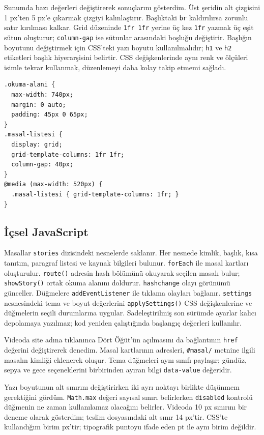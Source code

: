 \documentclass[12pt,a4paper]{article}
\begin{document}
Sunumda bazı değerleri değiştirerek sonuçlarını gösterdim. Üst şeridin alt çizgisini 1 px'ten 5 px'e çıkarmak çizgiyi kalınlaştırır. Başlıktaki \texttt{br} kaldırılırsa zorunlu satır kırılması kalkar. Grid düzeninde \texttt{1fr 1fr} yerine üç kez \texttt{1fr} yazmak üç eşit sütun oluşturur; \texttt{column-gap} ise sütunlar arasındaki boşluğu değiştirir. Başlığın boyutunu değiştirmek için CSS'teki yazı boyutu kullanılmalıdır; \texttt{h1} ve \texttt{h2} etiketleri başlık hiyerarşisini belirtir. CSS değişkenlerinde aynı renk ve ölçüleri isimle tekrar kullanmak, düzenlemeyi daha kolay takip etmemi sağladı.

\begin{lstlisting}[caption={İçsel CSS'ten önemli bir bölüm}]
.okuma-alani {
  max-width: 740px;
  margin: 0 auto;
  padding: 45px 0 65px;
}
.masal-listesi {
  display: grid;
  grid-template-columns: 1fr 1fr;
  column-gap: 40px;
}
@media (max-width: 520px) {
  .masal-listesi { grid-template-columns: 1fr; }
}
\end{lstlisting}

\subsection{İçsel JavaScript}
Masallar \texttt{stories} dizisindeki nesnelerde saklanır. Her nesnede kimlik, başlık, kısa tanıtım, paragraf listesi ve kaynak bilgileri bulunur. \texttt{forEach} ile masal kartları oluşturulur. \texttt{route()} adresin hash bölümünü okuyarak seçilen masalı bulur; \texttt{showStory()} ortak okuma alanını doldurur. \texttt{hashchange} olayı görünümü günceller. Düğmelere \texttt{addEventListener} ile tıklama olayları bağlanır. \texttt{settings} nesnesindeki tema ve boyut değerlerini \texttt{applySettings()} CSS değişkenlerine ve düğmelerin seçili durumlarına uygular. Sadeleştirilmiş son sürümde ayarlar kalıcı depolamaya yazılmaz; kod yeniden çalıştığında başlangıç değerleri kullanılır.

Videoda site adına tıklanınca Dört Öğüt'ün açılmasını da bağlantının \texttt{href} değerini değiştirerek denedim. Masal kartlarının adresleri, \texttt{\#masal/} metnine ilgili masalın kimliği eklenerek oluşur. Tema düğmeleri aynı sınıfı paylaşır; gündüz, sepya ve gece seçeneklerini birbirinden ayıran bilgi \texttt{data-value} değeridir.

Yazı boyutunun alt sınırını değiştirirken iki ayrı noktayı birlikte düşünmem gerektiğini gördüm. \texttt{Math.max} değeri sayısal sınırı belirlerken \texttt{disabled} kontrolü düğmenin ne zaman kullanılamaz olacağını belirler. Videoda 10 px sınırını bir deneme olarak gösterdim; teslim dosyasındaki alt sınır 14 px'tir. CSS'te kullandığım birim px'tir; tipografik puntoyu ifade eden pt ile aynı birim değildir.
\end{document}
